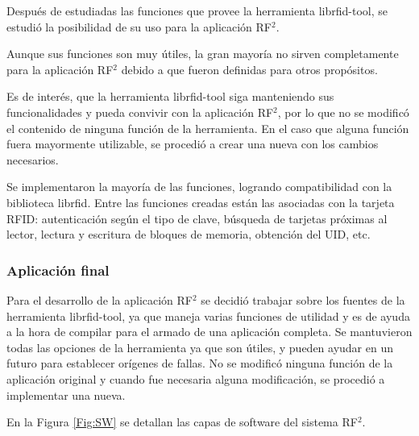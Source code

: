 \documentclass[%
        final,
        notitlepage,
        narroweqnarray,
        inline,
        ]{ieee}
\begin{document}
Después de estudiadas las funciones que provee la herramienta librfid-tool, se estudió la posibilidad de su uso para la aplicación RF$^{2}$. 

Aunque sus funciones  son muy útiles, la gran mayoría no sirven completamente para la aplicación RF$^{2}$ debido a que fueron definidas para otros propósitos. 

Es de interés, que la herramienta librfid-tool siga manteniendo sus funcionalidades y pueda convivir con la aplicación RF$^{2}$, por lo que no se modificó el contenido de ninguna función de la herramienta. En el caso que alguna función fuera mayormente utilizable, se procedió a crear una nueva con los cambios necesarios.

Se implementaron la mayoría de las funciones, logrando compatibilidad con la biblioteca librfid. Entre las funciones creadas están las asociadas con la tarjeta RFID: autenticación según el tipo de clave, búsqueda de tarjetas próximas al lector, lectura y escritura de bloques de memoria, obtención del UID, etc.

\subsubsection{Aplicación final}

Para el desarrollo de la aplicación RF$^{2}$ se decidió trabajar sobre los fuentes de la herramienta librfid-tool, ya que maneja varias funciones de utilidad y es de ayuda a la hora de compilar para el armado de una aplicación completa. Se mantuvieron todas las opciones de la herramienta ya que son útiles, y pueden ayudar en un futuro para establecer orígenes de fallas. No se modificó ninguna función de la aplicación original y cuando fue necesaria alguna modificación, se procedió a implementar una nueva.

En la Figura \ref{Fig:SW} se detallan las capas de software del sistema RF$^{2}$.
\end{document}
